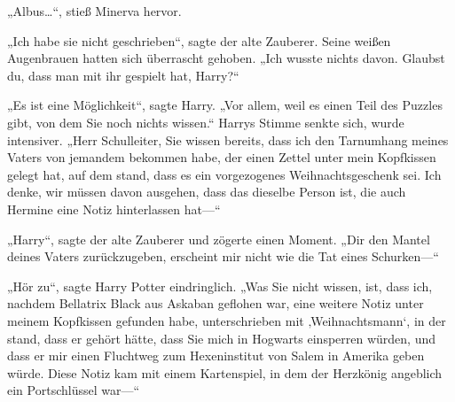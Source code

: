 „Albus…“, stieß Minerva hervor.

„Ich habe sie nicht geschrieben“, sagte der alte Zauberer. Seine weißen Augenbrauen hatten sich überrascht gehoben. „Ich wusste nichts davon. Glaubst du, dass man mit ihr gespielt hat, Harry?“

„Es ist eine Möglichkeit“, sagte Harry. „Vor allem, weil es einen Teil des Puzzles gibt, von dem Sie noch nichts wissen.“ Harrys Stimme senkte sich, wurde intensiver. „Herr Schulleiter, Sie wissen bereits, dass ich den Tarnumhang meines Vaters von jemandem bekommen habe, der einen Zettel unter mein Kopfkissen gelegt hat, auf dem stand, dass es ein vorgezogenes Weihnachtsgeschenk sei. Ich denke, wir müssen davon ausgehen, dass das dieselbe Person ist, die auch Hermine eine Notiz hinterlassen hat—“

„Harry“, sagte der alte Zauberer und zögerte einen Moment. „Dir den Mantel deines Vaters zurückzugeben, erscheint mir nicht wie die Tat eines Schurken—“

„Hör zu“, sagte Harry Potter eindringlich. „Was Sie nicht wissen, ist, dass ich, nachdem Bellatrix Black aus Askaban geflohen war, eine weitere Notiz unter meinem Kopfkissen gefunden habe, unterschrieben mit ‚Weihnachtsmann‘, in der stand, dass er gehört hätte, dass Sie mich in Hogwarts einsperren würden, und dass er mir einen Fluchtweg zum Hexeninstitut von Salem in Amerika geben würde. Diese Notiz kam mit einem Kartenspiel, in dem der Herzkönig angeblich ein Portschlüssel war—“

